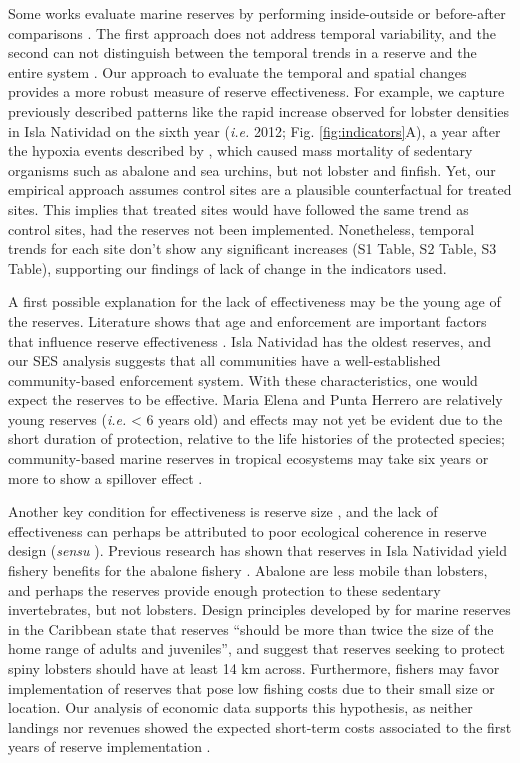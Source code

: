 \documentclass{frontiersSCNS}
\begin{document}
Some works evaluate marine reserves by performing inside-outside
\citep{guidetti_2014-8Z,friedlander_2017-oI,rodriguez_2017-PD} or
before-after comparisons \citep{betti_2017-lq}. The first approach does
not address temporal variability, and the second can not distinguish
between the temporal trends in a reserve and the entire system
\citep{depalma_2018}. Our approach to evaluate the temporal and spatial
changes provides a more robust measure of reserve effectiveness. For
example, we capture previously described patterns like the rapid
increase observed for lobster densities in Isla Natividad on the sixth
year (\emph{i.e.} 2012; Fig. \ref{fig:indicators}A), a year after the
hypoxia events described by \citet{micheli_2012-EU}, which caused mass
mortality of sedentary organisms such as abalone and sea urchins, but
not lobster and finfish. Yet, our empirical approach assumes control
sites are a plausible counterfactual for treated sites. This implies
that treated sites would have followed the same trend as control sites,
had the reserves not been implemented. Nonetheless, temporal trends for
each site don't show any significant increases (S1 Table, S2 Table, S3
Table), supporting our findings of lack of change in the indicators
used.

A first possible explanation for the lack of effectiveness may be the
young age of the reserves. Literature shows that age and enforcement are
important factors that influence reserve effectiveness
\citep{edgar_2014-UO,babcock_2010}. Isla Natividad has the oldest
reserves, and our SES analysis suggests that all communities have a
well-established community-based enforcement system. With these
characteristics, one would expect the reserves to be effective. Maria
Elena and Punta Herrero are relatively young reserves (\emph{i.e.}
\textless{} 6 years old) and effects may not yet be evident due to the
short duration of protection, relative to the life histories of the
protected species; community-based marine reserves in tropical
ecosystems may take six years or more to show a spillover effect
\citep{dasilva_2015-zX}.

Another key condition for effectiveness is reserve size
\citep{edgar_2014-UO}, and the lack of effectiveness can perhaps be
attributed to poor ecological coherence in reserve design (\emph{sensu}
\citet{rees_2018}). Previous research has shown that reserves in Isla
Natividad yield fishery benefits for the abalone fishery
\citep{rossetto_2015-V0}. Abalone are less mobile than lobsters, and
perhaps the reserves provide enough protection to these sedentary
invertebrates, but not lobsters. Design principles developed by
\citet{green_2017} for marine reserves in the Caribbean state that
reserves ``should be more than twice the size of the home range of
adults and juveniles'', and suggest that reserves seeking to protect
spiny lobsters should have at least 14 km across. Furthermore, fishers
may favor implementation of reserves that pose low fishing costs due to
their small size or location. Our analysis of economic data supports
this hypothesis, as neither landings nor revenues showed the expected
short-term costs associated to the first years of reserve implementation
\citep{ovando_2016-Wg}.
\end{document}
